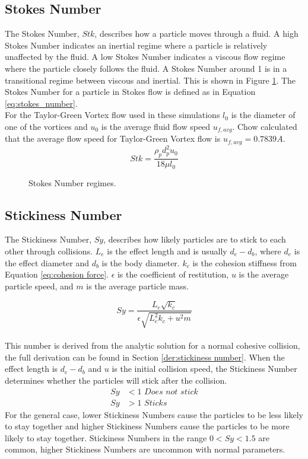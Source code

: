 \documentclass[a4paper,11pt,titlepage]{report}
\begin{document}
\subsection{Stokes Number}
\label{sec:stokes number}
The Stokes Number, $Stk$, describes how a particle moves through a fluid. A high Stokes Number indicates an inertial regime where a particle is relatively unaffected by the fluid. A low Stokes Number indicates a viscous flow regime where the particle closely follows the fluid. A Stokes Number around 1 is in a transitional regime between viscous and inertial. This is shown in Figure \ref{fig:stokes_number}. The Stokes Number for a particle in Stokes flow is defined as in Equation \ref{eq:stokes_number}\cite{achow}.
\\For the Taylor-Green Vortex flow used in these simulations $l_0$ is the diameter of one of the vortices and $u_0$ is the average fluid flow speed $u_{f,avg}$. Chow\cite{achow} calculated that the average flow speed for Taylor-Green Vortex flow is $u_{f,avg} = 0.7839A$.
\begin{equation}
Stk = \dfrac{\rho_p d_p^2 u_0}{18 \mu l_0}
\label{eq:stokes_number}
\end{equation}
\begin{figure}[!htb]
\centering

\caption{Stokes Number regimes.}
\label{fig:stokes_number}
\end{figure}
\subsection{Stickiness Number}
\label{sec:stickiness number}
The Stickiness Number, $Sy$, describes how likely particles are to stick to each other through collisions. $L_e$ is the effect length and is usually $d_e - d_b$, where $d_e$ is the effect diameter and $d_b$ is the body diameter. $k_c$ is the cohesion stiffness from Equation \ref{eq:cohesion force}. $\epsilon$ is the coefficient of restitution, $u$ is the average particle speed, and $m$ is the average particle mass.

\begin{equation}
Sy = \dfrac{L_e \sqrt{k_c}}{\epsilon \sqrt{L_e^2 k_c + u^2 m}}
\end{equation}
\\This number is derived from the analytic solution for a normal cohesive collision, the full derivation can be found in Section \ref{der:stickiness number}. When the effect length is $d_e - d_b$ and $u$ is the initial collision speed, the Stickiness Number determines whether the particles will stick after the collision.
\begin{align*}
Sy &< 1 \textit{ Does not stick}
\\ Sy & > 1 \textit{ Sticks}
\end{align*}
For the general case, lower Stickiness Numbers cause the particles to be less likely to stay together and higher Stickiness Numbers cause the particles to be more likely to stay together. Stickiness Numbers in the range $0 < Sy < 1.5$ are common, higher Stickiness Numbers are uncommon with normal parameters.
\end{document}
